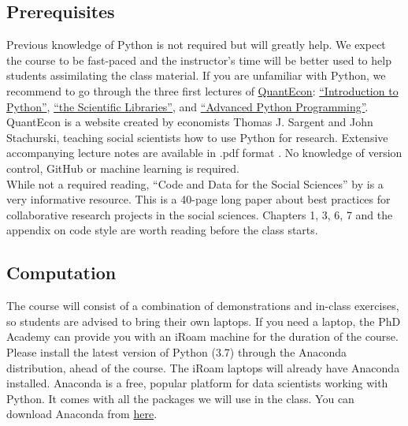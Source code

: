 \documentclass{amsart}
\theoremstyle{definition}
\theoremstyle{remark}
\numberwithin{equation}{section}
\begin{document}
\subsection*{Prerequisites}

Previous knowledge of Python is not required but will greatly help. We expect the course to be fast-paced and the instructor's time will be better used to help students assimilating the class material. If you are unfamiliar with Python, we recommend to go through the three first lectures of \href{https://lectures.quantecon.org/py/}{QuantEcon}: \href{https://lectures.quantecon.org/py/index_learning_python.html}{``Introduction to Python''}, \href{https://lectures.quantecon.org/py/index_python_scientific_libraries.html}{``the Scientific Libraries''}, and \href{https://lectures.quantecon.org/py/index_advanced_python_programming.html}{``Advanced Python Programming''}. QuantEcon is a website created by economists Thomas J. Sargent and John Stachurski, teaching social scientists how to use Python for research. Extensive accompanying lecture notes are available in .pdf format \citep{sargent2019lectures}. No knowledge of version control, GitHub or machine learning is required.\\

While not a required reading, ``Code and Data for the Social Sciences'' by \cite{gentzkow2014code} is a very informative resource. This is a 40-page long paper about best practices for collaborative research projects in the social sciences. Chapters 1, 3, 6, 7 and the appendix on code style are worth reading before the class starts.

\subsection*{Computation}

The course will consist of a combination of demonstrations and in-class exercises, so students are advised to bring their own laptops. If you need a laptop, the PhD Academy can provide you with an iRoam machine for the duration of the course.\\

Please install the latest version of Python (3.7) through the Anaconda distribution, ahead of the course. The iRoam laptops will already have Anaconda installed. Anaconda is a free, popular platform for data scientists working with Python. It comes with all the packages we will use in the class. You can download Anaconda from \href{https://www.anaconda.com/distribution/}{here}.
\end{document}
